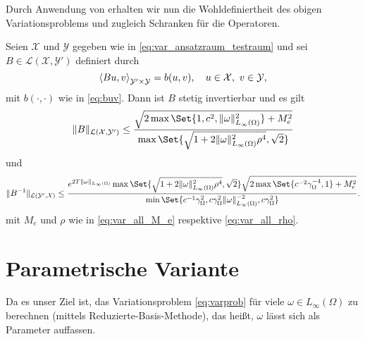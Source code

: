 Durch Anwendung von  erhalten wir nun die Wohldefiniertheit des obigen Variationsproblems und zugleich Schranken für die Operatoren.

\begin{Lemma}
    Seien $\mathcal X$ und $\mathcal Y$ gegeben wie in \eqref{eq:var_ansatzraum_testraum} und sei $B \in \mathcal L (\mathcal X, \mathcal Y')$ definiert durch
    \begin{equation}
        \left\langle Bu,v\right\rangle_{\mathcal Y' \times \mathcal Y}  = b(u, v), \quad u \in \mathcal X,~ v \in \mathcal Y,
    \end{equation}
    mit $b(\cdot, \cdot)$ wie in \eqref{eq:buv}.
    Dann ist $B$ stetig invertierbar und es gilt
    \begin{equation}
        \norm{B}_{\mathcal L(\mathcal X, \mathcal Y')}
        \leq
        \frac{\sqrt{2 \max\Set{1, c^{2}, \norm{\omega}_{L_{\infty}(\Omega)}^{2}} + M_{e}^{2}}}{\max\Set{\sqrt{1 + 2 \norm{\omega}_{L_{\infty}(\Omega)}^{2} \rho^{4}}, \sqrt{2} }}
    \end{equation}
    und
    \begin{equation}
        \norm{B^{-1}}_{\mathcal L( \mathcal Y', \mathcal X)}
        \leq \frac{e^{2 T \norm{\omega}_{L_{\infty}(\Omega)}} \max\Set{\sqrt{1 + 2 \norm{\omega}_{L_{\infty}(\Omega)}^{2} \rho^{4}}, \sqrt{2}} \sqrt{2 \max\Set{c^{-2} \gamma_{\Omega}^{-4}, 1} + M_{e}^{2}}}{\min\Set{c^{-1} \gamma_{\Omega}^{2}, c \gamma_{\Omega}^{2} \norm{\omega}_{L_{\infty}(\Omega)}^{-2}, c \gamma_{\Omega}^{2} }}.
    \end{equation}
    mit $M_{e}$ und $\rho$ wie in \eqref{eq:var_all_M_e} respektive \eqref{eq:var_all_rho}.
\end{Lemma}

\section{Parametrische Variante} %
\label{sec:parametrische_variante}

Da es unser Ziel ist, das Variationsproblem \eqref{eq:varprob} für viele $\omega \in L_{\infty}(\Omega)$ zu berechnen (mittels Reduzierte-Basis-Methode), das heißt, $\omega$ lässt sich als Parameter auffassen.

